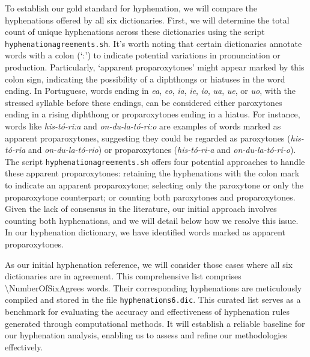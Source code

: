 To establish our gold standard for hyphenation, we will compare the
hyphenations offered by all six dictionaries. First, we will determine the total count
of unique hyphenations across these dictionaries using the script
\texttt{hyphenation\-agreements.sh}.
It's worth noting that certain dictionaries annotate words with a colon (`:') to
indicate potential variations in pronunciation or production.
Particularly, `apparent proparoxytones' might appear marked by this colon sign, indicating 
the possibility of a diphthongs or hiatuses in the word ending.
In Portuguese, words ending in \emph{ea}, \emph{eo}, \emph{ia}, \emph{ie},
\emph{io}, \emph{ua}, \emph{ue}, or \emph{uo}, with the stressed syllable
before these endings, can be considered either paroxytones ending in a rising
diphthong or proparoxytones ending in a hiatus. For instance, words like \emph{his-tó-ri:a}
and \emph{on-du-la-tó-ri:o} are examples of words marked as apparent
proparoxytones, suggesting they could be regarded as paroxytones (\emph{his-tó-ria}
and \emph{on-du-la-tó-rio}) or proparoxytones (\emph{his-tó-ri-a} and
\emph{on-du-la-tó-ri-o}). The script \texttt{hyphenationagreements.sh} 
offers four potential approaches to handle these apparent proparoxytones:
retaining the hyphenations with the colon mark to indicate an apparent proparoxytone; 
selecting only the paroxytone or only the proparoxytone counterpart; or counting both paroxytones and proparoxytones. 
Given the lack of consensus in the literature, our initial approach involves 
counting both hyphenations, and we will detail below how we resolve this issue. 
In our hyphenation dictionary, we have identified \NumberOfAppProp{} words marked as apparent proparoxytones.

As our initial hyphenation reference, we will consider those cases where all
six dictionaries are in agreement. This comprehensive list comprises
\num{\NumberOfSixAgrees} words. Their corresponding hyphenations are
meticulously compiled and stored in the file \texttt{hyphenations6.dic}. This
curated list serves as a benchmark for evaluating the accuracy and
effectiveness of hyphenation rules generated through computational methods. It
will establish a reliable baseline for our hyphenation analysis, enabling us to
assess and refine our methodologies effectively.

